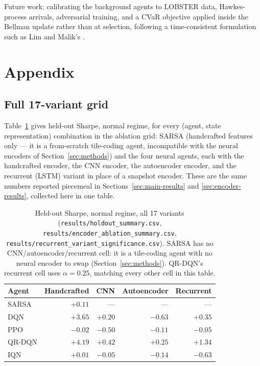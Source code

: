 \documentclass[10pt,twocolumn]{article}
\begin{document}
Future work: calibrating the background agents to LOBSTER data, Hawkes-process arrivals, adversarial training, and a CVaR objective applied inside the Bellman update rather than at selection, following a time-consistent formulation such as Lim and Malik's \citep{lim2022}.




\appendix
\section{Appendix}

\subsection{Full 17-variant grid}
\label{sec:appendix-grid}
Table~\ref{tab:grid} gives held-out Sharpe, normal regime, for every (agent, state representation) combination in the ablation grid: SARSA (handcrafted features only --- it is a from-scratch tile-coding agent, incompatible with the neural encoders of Section~\ref{sec:methods}) and the four neural agents, each with the handcrafted encoder, the CNN encoder, the autoencoder encoder, and the recurrent (LSTM) variant in place of a snapshot encoder. These are the same numbers reported piecemeal in Sections~\ref{sec:main-results} and \ref{sec:encoder-results}, collected here in one table.

\begin{table}[t]
\centering\footnotesize
\begin{tabular}{lrrrr}
\toprule
Agent & Handcrafted & CNN & Autoencoder & Recurrent \\
\midrule
SARSA   & $+0.11$ & --- & --- & --- \\
DQN     & $+3.65$ & $+0.20$ & $-0.63$ & $+0.35$ \\
PPO     & $-0.02$ & $-0.50$ & $-0.11$ & $-0.05$ \\
QR-DQN  & $+4.19$ & $+0.42$ & $+0.25$ & $+1.34$ \\
IQN     & $+0.01$ & $-0.05$ & $-0.14$ & $-0.63$ \\
\bottomrule
\end{tabular}
\caption{Held-out Sharpe, normal regime, all 17 variants (\texttt{results/holdout\_summary.csv}, \texttt{results/encoder\_ablation\_summary.csv}, \texttt{results/recurrent\_variant\_significance.csv}). SARSA has no CNN/autoencoder/recurrent cell: it is a tile-coding agent with no neural encoder to swap (Section~\ref{sec:methods}). QR-DQN's recurrent cell uses $\alpha=0.25$, matching every other cell in this table.}
\label{tab:grid}
\end{table}
\end{document}
